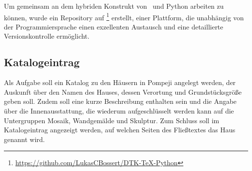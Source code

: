 \documentclass[ngerman]{dtk}
\begin{document}
Um gemeinsam an dem hybriden Konstrukt von \XeLaTeX\ und Python arbeiten zu können, wurde ein Repository auf \footnote{\url{https://github.com/LukasCBossert/DTK-TeX-Python}} erstellt, einer Plattform,  
die unabhängig von der Programmiersprache einen exzellenten Austausch und eine detaillierte Versionskontrolle ermöglicht.


\subsection{Katalogeintrag}

Als Aufgabe soll ein Katalog zu den Häusern in Pompeji angelegt werden,
der Auskunft über den Namen des Hauses, dessen Verortung und Grundstücksgröße  geben soll.
Zudem soll eine kurze Beschreibung enthalten sein und die Angabe über die Innenausstattung, 
die wiederum aufgeschlüsselt werden kann auf die Untergruppen Mosaik, Wandgemälde und Skulptur. 
Zum Schluss soll im Katalogeintrag angezeigt werden, 
auf welchen Seiten des Fließtextes das Haus genannt wird.
\end{document}
